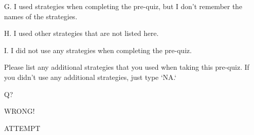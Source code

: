 \documentclass{ximera}
\begin{document}
\begin{problem}
    G. I used strategies when completing the pre-quiz, but I don't remember the names of the strategies.

    \begin{multipleChoice}
    \end{multipleChoice}
    
    H. I used other strategies that are not listed here.

    \begin{multipleChoice}
    \end{multipleChoice}
    
    I. I did not use any strategies when completing the pre-quiz.

    \begin{multipleChoice}
    \end{multipleChoice}

\end{problem}


\begin{problem}
    Please list any additional strategies that you used when taking this pre-quiz. If you didn't use any additional strategies, just type `NA.`
   \begin{freeResponse}
   \end{freeResponse}
\end{problem}

\begin{problem}

Q?

    \begin{multipleChoice}
        
    \begin{feedback}[wrong]
    WRONG!
    \end{feedback}
    
    \end{multipleChoice}
    
        \begin{feedback}[attempt]
    ATTEMPT
    \end{feedback}
   

\end{problem}



%
\end{document}
